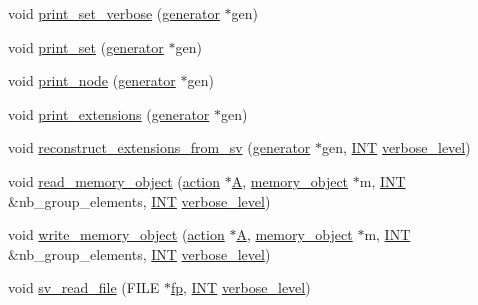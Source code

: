 \begin{DoxyCompactItemize}
\item 
void \mbox{\hyperlink{classoracle_ab0456da7b7a451650ca11f21b648a091}{print\+\_\+set\+\_\+verbose}} (\mbox{\hyperlink{classgenerator}{generator}} $\ast$gen)
\item 
void \mbox{\hyperlink{classoracle_ad61bc9aa21c6a21da3845c83450faedc}{print\+\_\+set}} (\mbox{\hyperlink{classgenerator}{generator}} $\ast$gen)
\item 
void \mbox{\hyperlink{classoracle_a8df91a7021b0e44a5c535515aa9c2062}{print\+\_\+node}} (\mbox{\hyperlink{classgenerator}{generator}} $\ast$gen)
\item 
void \mbox{\hyperlink{classoracle_a0f52757cf7b3c1bf5c0d96811ac3a858}{print\+\_\+extensions}} (\mbox{\hyperlink{classgenerator}{generator}} $\ast$gen)
\item 
void \mbox{\hyperlink{classoracle_aedc4bf96551d4db582078917fe15aae6}{reconstruct\+\_\+extensions\+\_\+from\+\_\+sv}} (\mbox{\hyperlink{classgenerator}{generator}} $\ast$gen, \mbox{\hyperlink{galois_8h_a09fddde158a3a20bd2dcadb609de11dc}{I\+NT}} \mbox{\hyperlink{simeon_8_c_a818073fbcc2f439e7c56952f67386122}{verbose\+\_\+level}})
\item 
void \mbox{\hyperlink{classoracle_af40f5b470a06d88dde9a9fc90a90b2e7}{read\+\_\+memory\+\_\+object}} (\mbox{\hyperlink{classaction}{action}} $\ast$\mbox{\hyperlink{simeon_8_c_a97833f04c3a9c008df5521a2fc291bb4}{A}}, \mbox{\hyperlink{classmemory__object}{memory\+\_\+object}} $\ast$m, \mbox{\hyperlink{galois_8h_a09fddde158a3a20bd2dcadb609de11dc}{I\+NT}} \&nb\+\_\+group\+\_\+elements, \mbox{\hyperlink{galois_8h_a09fddde158a3a20bd2dcadb609de11dc}{I\+NT}} \mbox{\hyperlink{simeon_8_c_a818073fbcc2f439e7c56952f67386122}{verbose\+\_\+level}})
\item 
void \mbox{\hyperlink{classoracle_a5d3200ed92f7075452876de4a9af3f99}{write\+\_\+memory\+\_\+object}} (\mbox{\hyperlink{classaction}{action}} $\ast$\mbox{\hyperlink{simeon_8_c_a97833f04c3a9c008df5521a2fc291bb4}{A}}, \mbox{\hyperlink{classmemory__object}{memory\+\_\+object}} $\ast$m, \mbox{\hyperlink{galois_8h_a09fddde158a3a20bd2dcadb609de11dc}{I\+NT}} \&nb\+\_\+group\+\_\+elements, \mbox{\hyperlink{galois_8h_a09fddde158a3a20bd2dcadb609de11dc}{I\+NT}} \mbox{\hyperlink{simeon_8_c_a818073fbcc2f439e7c56952f67386122}{verbose\+\_\+level}})
\item 
void \mbox{\hyperlink{classoracle_a57d236ce4ae82f8b34c318a558db1a59}{sv\+\_\+read\+\_\+file}} (F\+I\+LE $\ast$\mbox{\hyperlink{k__arc__lifting_8_c_a67cc9fbd0817c2d140368e5ed1f2a44d}{fp}}, \mbox{\hyperlink{galois_8h_a09fddde158a3a20bd2dcadb609de11dc}{I\+NT}} \mbox{\hyperlink{simeon_8_c_a818073fbcc2f439e7c56952f67386122}{verbose\+\_\+level}})

\end{DoxyCompactItemize}
